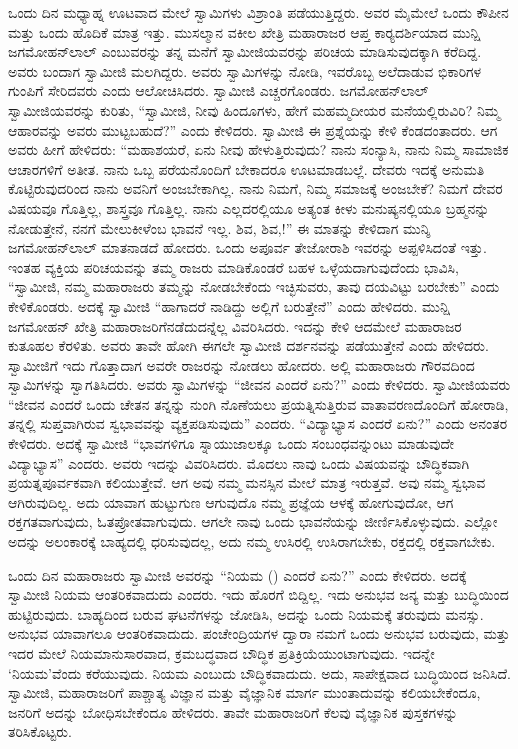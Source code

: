  ಒಂದು ದಿನ ಮಧ್ಯಾಹ್ನ ಊಟವಾದ ಮೇಲೆ ಸ್ವಾಮಿಗಳು ವಿಶ್ರಾಂತಿ ಪಡೆಯುತ್ತಿದ್ದರು. ಅವರ ಮೈಮೇಲೆ ಒಂದು ಕೌಪೀನ ಮತ್ತು ಒಂದು ಹೊದಿಕೆ ಮಾತ್ರ ಇತ್ತು. ಮುಸಲ್ಮಾನ ವಕೀಲ ಖೇತ್ರಿ ಮಹಾರಾಜರ ಆಪ್ತ ಕಾರ‍್ಯದರ್ಶಿಯಾದ ಮುನ್ಷಿ ಜಗಮೋಹನ್‍ಲಾಲ್ ಎಂಬುವರನ್ನು ತನ್ನ ಮನೆಗೆ ಸ್ವಾಮೀಜಿಯವರನ್ನು ಪರಿಚಯ ಮಾಡಿಸುವುದಕ್ಕಾಗಿ ಕರೆದಿದ್ದ. ಅವರು ಬಂದಾಗ ಸ್ವಾಮೀಜಿ ಮಲಗಿದ್ದರು. ಅವರು ಸ್ವಾಮಿಗಳನ್ನು ನೋಡಿ, ಇವರೊಬ್ಬ ಅಲೆದಾಡುವ ಭಿಕಾರಿಗಳ ಗುಂಪಿಗೆ ಸೇರಿದವರು ಎಂದು ಆಲೋಚಿಸಿದರು. ಸ್ವಾಮೀಜಿ ಎಚ್ಚರಗೊಂಡರು. ಜಗಮೋಹನ್‍ಲಾಲ್ ಸ್ವಾಮೀಜಿಯವರನ್ನು ಕುರಿತು, “ಸ್ವಾಮೀಜಿ, ನೀವು ಹಿಂದೂಗಳು, ಹೇಗೆ ಮಹಮ್ಮದೀಯರ ಮನೆಯಲ್ಲಿರುವಿರಿ? ನಿಮ್ಮ ಆಹಾರವನ್ನು ಅವರು ಮುಟ್ಟಬಹುದೆ?” ಎಂದು ಕೇಳಿದರು. ಸ್ವಾಮೀಜಿ ಈ ಪ್ರಶ್ನೆಯನ್ನು ಕೇಳಿ ಕೆಂಡದಂತಾದರು. ಆಗ ಅವರು ಹೀಗೆ ಹೇಳಿದರು: “ಮಹಾಶಯರೆ, ಏನು ನೀವು ಹೇಳುತ್ತಿರುವುದು? ನಾನು ಸಂನ್ಯಾಸಿ, ನಾನು ನಿಮ್ಮ ಸಾಮಾಜಿಕ ಆಚಾರಗಳಿಗೆ ಅತೀತ. ನಾನು ಒಬ್ಬ ಪರೆಯನೊಂದಿಗೆ ಬೇಕಾದರೂ ಊಟಮಾಡಬಲ್ಲೆ. ದೇವರು ಇದಕ್ಕೆ ಅನುಮತಿ ಕೊಟ್ಟಿರುವುದರಿಂದ ನಾನು ಅವನಿಗೆ ಅಂಜಬೇಕಾಗಿಲ್ಲ. ನಾನು ನಿಮಗೆ, ನಿಮ್ಮ ಸಮಾಜಕ್ಕೆ ಅಂಜಬೇಕೆ? ನಿಮಗೆ ದೇವರ ವಿಷಯವೂ ಗೊತ್ತಿಲ್ಲ, ಶಾಸ್ತ್ರವೂ ಗೊತ್ತಿಲ್ಲ. ನಾನು ಎಲ್ಲದರಲ್ಲಿಯೂ ಅತ್ಯಂತ ಕೀಳು ಮನುಷ್ಯನಲ್ಲಿಯೂ ಬ್ರಹ್ಮನನ್ನು ನೋಡುತ್ತೇನೆ, ನನಗೆ ಮೇಲುಕೀಳೆಂಬ ಭಾವನೆ ಇಲ್ಲ. ಶಿವ, ಶಿವ,!” ಈ ಮಾತನ್ನು ಕೇಳಿದಾಗ ಮುನ್ಶಿ ಜಗಮೋಹನ್‍ಲಾಲ್ ಮಾತನಾಡದೆ ಹೋದರು. ಒಂದು ಅಪೂರ್ವ ತೇಜೋರಾಶಿ ಇವರನ್ನು ಅಪ್ಪಳಿಸಿದಂತೆ ಇತ್ತು. ಇಂತಹ ವ್ಯಕ್ತಿಯ ಪರಿಚಯವನ್ನು ತಮ್ಮ ರಾಜರು ಮಾಡಿಕೊಂಡರೆ ಬಹಳ ಒಳ್ಳೆಯದಾಗುವುದೆಂದು ಭಾವಿಸಿ, “ಸ್ವಾಮೀಜಿ, ನಮ್ಮ ಮಹಾರಾಜರು ತಮ್ಮನ್ನು ನೋಡಬೇಕೆಂದು ಇಚ್ಛಿಸುವರು, ತಾವು ದಯವಿಟ್ಟು ಬರಬೇಕು” ಎಂದು ಕೇಳಿಕೊಂಡರು. ಅದಕ್ಕೆ ಸ್ವಾಮೀಜಿ “ಹಾಗಾದರೆ ನಾಡಿದ್ದು ಅಲ್ಲಿಗೆ ಬರುತ್ತೇನೆ” ಎಂದು ಹೇಳಿದರು. ಮುನ್ಷಿ ಜಗಮೋಹನ್ ಖೇತ್ರಿ ಮಹಾರಾಜರಿಗೆ\break ನಡೆದುದನ್ನೆಲ್ಲ ವಿವರಿಸಿದರು. ಇದನ್ನು ಕೇಳಿ ಆದಮೇಲೆ ಮಹಾರಾಜರ ಕುತೂಹಲ ಕೆರಳಿತು. ಅವರು ತಾವೇ ಹೋಗಿ ಈಗಲೇ ಸ್ವಾಮೀಜಿ ದರ್ಶನವನ್ನು ಪಡೆಯುತ್ತೇನೆ ಎಂದು ಹೇಳಿದರು. ಸ್ವಾಮೀಜಿಗೆ ಇದು ಗೊತ್ತಾದಾಗ ಅವರೇ ರಾಜರನ್ನು ನೋಡಲು ಹೋದರು. ಅಲ್ಲಿ ಮಹಾರಾಜರು ಗೌರವದಿಂದ ಸ್ವಾಮಿಗಳನ್ನು ಸ್ವಾಗತಿಸಿದರು. ಅವರು ಸ್ವಾಮಿಗಳನ್ನು “ಜೀವನ ಎಂದರೆ ಏನು?” ಎಂದು ಕೇಳಿದರು. ಸ್ವಾಮೀಜಿಯವರು “ಜೀವನ ಎಂದರೆ ಒಂದು ಚೇತನ ತನ್ನನ್ನು ನುಂಗಿ ನೊಣೆಯಲು ಪ್ರಯತ್ನಿಸುತ್ತಿರುವ ವಾತಾವರಣದೊಂದಿಗೆ ಹೋರಾಡಿ, ತನ್ನಲ್ಲಿ ಸುಪ್ತವಾಗಿರುವ ಸ್ವಭಾವವನ್ನು ವ್ಯಕ್ತಪಡಿಸುವುದು” ಎಂದರು. “ವಿದ್ಯಾಭ್ಯಾಸ ಎಂದರೆ ಏನು?” ಎಂದು ಅನಂತರ ಕೇಳಿದರು. ಅದಕ್ಕೆ ಸ್ವಾಮೀಜಿ “ಭಾವಗಳಿಗೂ ಸ್ನಾಯುಜಾಲಕ್ಕೂ ಒಂದು ಸಂಬಂಧವನ್ನುಂಟು ಮಾಡುವುದೇ ವಿದ್ಯಾಭ್ಯಾಸ” ಎಂದರು. ಅವರು ಇದನ್ನು ವಿವರಿಸಿದರು. ಮೊದಲು ನಾವು ಒಂದು ವಿಷಯವನ್ನು ಬೌದ್ಧಿಕವಾಗಿ ಪ್ರಯತ್ನಪೂರ್ವಕವಾಗಿ ಕಲಿಯುತ್ತೇವೆ. ಆಗ ಅವು ನಮ್ಮ ಮನಸ್ಸಿನ ಮೇಲೆ ಮಾತ್ರ ಇರುತ್ತವೆ. ಅವು ನಮ್ಮ ಸ್ವಭಾವ ಆಗಿರುವುದಿಲ್ಲ. ಅದು ಯಾವಾಗ ಹುಟ್ಟುಗುಣ ಆಗುವುದೊ ನಮ್ಮ ಪ್ರಜ್ಞೆಯ ಆಳಕ್ಕೆ ಹೋಗುವುದೋ, ಆಗ ರಕ್ತಗತವಾಗುವುದು, ಓತಪ್ರೋತವಾಗುವುದು. ಆಗಲೇ ನಾವು ಒಂದು ಭಾವನೆಯನ್ನು ಜೀರ್ಣಿಸಿಕೊಳ್ಳುವುದು. ಎಲ್ಲೋ ಅದನ್ನು ಅಲಂಕಾರಕ್ಕೆ ಬಾಹ್ಯದಲ್ಲಿ ಧರಿಸುವುದಲ್ಲ, ಅದು ನಮ್ಮ ಉಸಿರಲ್ಲಿ ಉಸಿರಾಗಬೇಕು, ರಕ್ತದಲ್ಲಿ ರಕ್ತವಾಗಬೇಕು. 

 ಒಂದು ದಿನ ಮಹಾರಾಜರು ಸ್ವಾಮೀಜಿ ಅವರನ್ನು “ನಿಯಮ () ಎಂದರೆ ಏನು?” ಎಂದು ಕೇಳಿದರು. ಅದಕ್ಕೆ ಸ್ವಾಮೀಜಿ ನಿಯಮ ಆಂತರಿಕವಾದುದು ಎಂದರು. ಇದು ಹೊರಗೆ ಬಿದ್ದಿಲ್ಲ. ಇದು ಅನುಭವ ಜನ್ಯ ಮತ್ತು ಬುದ್ಧಿಯಿಂದ ಹುಟ್ಟಿರುವುದು. ಬಾಹ್ಯದಿಂದ ಬರುವ ಘಟನೆಗಳನ್ನು ಜೋಡಿಸಿ, ಅದನ್ನು ಒಂದು ನಿಯಮಕ್ಕೆ ತರುವುದು ಮನಸ್ಸು. ಅನುಭವ ಯಾವಾಗಲೂ ಆಂತರಿಕವಾದುದು. ಪಂಚೇಂದ್ರಿಯಗಳ ದ್ವಾರಾ ನಮಗೆ ಒಂದು ಅನುಭವ ಬರುವುದು, ಮತ್ತು ಇದರ ಮೇಲೆ ನಿಯಮಾನುಸಾರವಾದ, ಕ್ರಮಬದ್ಧವಾದ ಬೌದ್ಧಿಕ ಪ್ರತಿಕ್ರಿಯೆಯುಂಟಾಗುವುದು. ಇದನ್ನೇ ‘ನಿಯಮ’ವೆಂದು ಕರೆಯುವುದು. ನಿಯಮ ಎಂಬುದು ಬೌದ್ಧಿಕವಾದುದು. ಅದು, ಸಾಪೇಕ್ಷವಾದ ಬುದ್ಧಿಯಿಂದ ಜನಿಸಿದೆ. ಸ್ವಾಮೀಜಿ, ಮಹಾರಾಜರಿಗೆ ಪಾಶ್ಚಾತ್ಯ ವಿಜ್ಞಾನ ಮತ್ತು ವೈಜ್ಞಾನಿಕ ಮಾರ್ಗ ಮುಂತಾದುವನ್ನು ಕಲಿಯಬೇಕೆಂದೂ, ಜನರಿಗೆ ಅದನ್ನು ಬೋಧಿಸಬೇಕೆಂದೂ ಹೇಳಿದರು. ತಾವೇ ಮಹಾರಾಜರಿಗೆ ಕೆಲವು ವೈಜ್ಞಾನಿಕ ಪುಸ್ತಕಗಳನ್ನು ತರಿಸಿಕೊಟ್ಟರು. 

